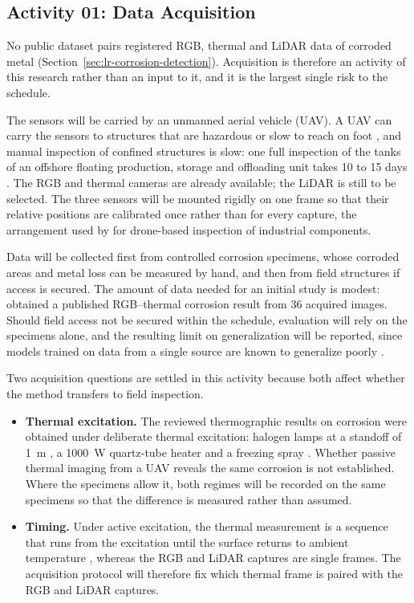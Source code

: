 \subsection{Activity 01: Data Acquisition}
\label{sec:acquisition}

No public dataset pairs registered RGB, thermal and LiDAR data of corroded metal
(Section~\ref{sec:lr-corrosion-detection}). Acquisition is therefore an activity
of this research rather than an input to it, and it is the largest single risk
to the schedule.

The sensors will be carried by an unmanned aerial vehicle (UAV). A UAV can carry
the sensors to structures that are hazardous or slow to reach on foot
\citep{Savino2025,Nooralishahi2022}, and manual inspection of confined
structures is slow: one full inspection of the tanks of an offshore floating
production, storage and offloading unit takes 10 to 15 days \citep{Soares2023}.
The RGB and thermal cameras are already available; the LiDAR is still to be
selected. The three sensors will be mounted rigidly on one frame so that their
relative positions are calibrated once rather than for every capture, the
arrangement used by \citet{Nooralishahi2022} for drone-based inspection of
industrial components.

Data will be collected first from controlled corrosion specimens, whose corroded
areas and metal loss can be measured by hand, and then from field structures if
access is secured. The amount of data needed for an initial study is modest:
\citet{Lim2021} obtained a published RGB--thermal corrosion result from 36
acquired images. Should field access not be secured within the schedule,
evaluation will rely on the specimens alone, and the resulting limit on
generalization will be reported, since models trained on data from a single
source are known to generalize poorly \citep{Nash2022}.

Two acquisition questions are settled in this activity because both affect
whether the method transfers to field inspection.
\begin{itemize}
  \item \textbf{Thermal excitation.} The reviewed thermographic results on
        corrosion were obtained under deliberate thermal excitation: halogen
        lamps at a standoff of 1~m \citep{Lim2021}, a 1000~W quartz-tube heater
        \citep{Elizalde2023} and a freezing spray \citep{Doshvarpassand2022}.
        Whether passive thermal imaging from a UAV reveals the same corrosion is
        not established. Where the specimens allow it, both regimes will be
        recorded on the same specimens so that the difference is measured
        rather than assumed.
  \item \textbf{Timing.} Under active excitation, the thermal measurement is a
        sequence that runs from the excitation until the surface returns to
        ambient temperature \citep{Doshvarpassand2022}, whereas the RGB and LiDAR
        captures are single frames. The acquisition protocol will therefore fix
        which thermal frame is paired with the RGB and LiDAR captures.
\end{itemize}


